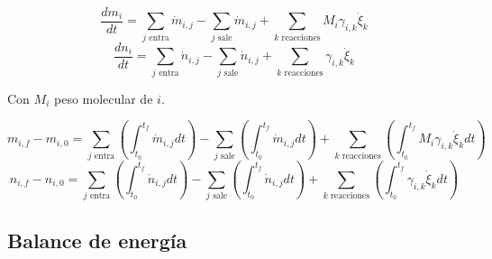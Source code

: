             \begin{equation}
            \label{eq:bm_rxn_sp_diff}
                \frac{d{m}_{i}}{dt} = \sum_{j \text{ entra}} \dot{m}_{i,j} - \sum_{j \text{ sale}} \dot{m}_{i,j} + \sum_{k \text{ reacciones}} M_{i}\gamma_{i,k}\dot{\xi}_{k}
            \end{equation}
            \begin{equation}
            \label{eq:bm_rxn_sp_diff_mol}
                \frac{d{n}_{i}}{dt} = \sum_{j \text{ entra}} \dot{n}_{i,j} - \sum_{j \text{ sale}} \dot{n}_{i,j} + \sum_{k \text{ reacciones}} \gamma_{i,k} \dot{\xi}_{k}
            \end{equation}
            
            Con \(M_{i}\) peso molecular de \(i\).
            
            \begin{equation}
            \label{eq:bm_rxn_sp_int}
                m_{i,f} - m_{i,0} = \sum_{j \text{ entra}} \left ( \int_{t_{0}}^{t_{f}} \dot{m}_{i,j} dt \right ) - \sum_{j \text{ sale}} \left ( \int_{t_{0}}^{t_{f}} \dot{m}_{i,j} dt \right )  + \sum_{k \text{ reacciones}} \left ( \int_{t_{0}}^{t_{f}} M_{i} \gamma_{i,k} \dot{\xi}_{k} dt \right )
            \end{equation}
            \begin{equation}
            \label{eq:bm_rxn_sp_int_mol}
                n_{i,f} - n_{i,0} = \sum_{j \text{ entra}} \left ( \int_{t_{0}}^{t_{f}} \dot{n}_{i,j} dt \right ) - \sum_{j \text{ sale}} \left ( \int_{t_{0}}^{t_{f}} \dot{n}_{i,j} dt \right )  + \sum_{k \text{ reacciones}} \left ( \int_{t_{0}}^{t_{f}} \gamma_{i,k} \dot{\xi}_{k} dt \right )
            \end{equation}
        
    \subsection{Balance de energía}
        
